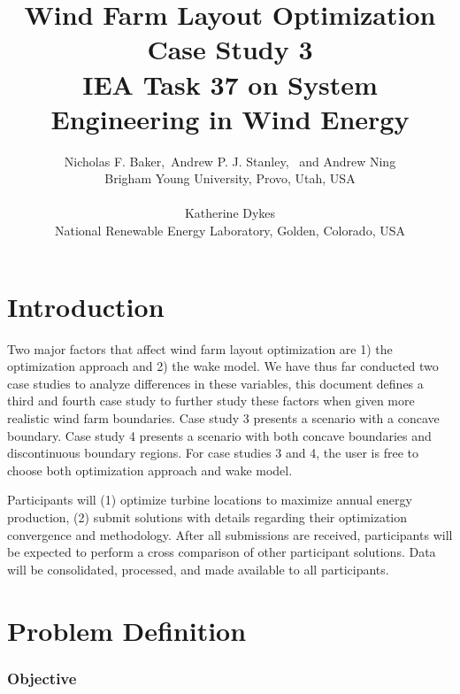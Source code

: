 \documentclass[10pt]{article}
\begin{document}
\title{Wind Farm Layout Optimization Case Study 3
\\
\small{IEA Task 37 on System Engineering in Wind Energy}
}
\author{\large Nicholas F. Baker,\  Andrew P. J. Stanley, \ and Andrew Ning \\
    {\small Brigham Young University, Provo, Utah, USA}\\
\vspace{-1em}\\
\large Katherine Dykes\\
    \small National Renewable Energy Laboratory, Golden, Colorado, USA}
\setlength{\droptitle}{-5em}
\maketitle

\section{Introduction}

    Two major factors that affect wind farm layout optimization are 1) the optimization approach and 2) the wake model.
    We have thus far conducted two case studies to analyze differences in these variables, this document defines a third and fourth case study to further study these factors when given more realistic wind farm boundaries.
    Case study 3 presents a scenario with a concave boundary.
    Case study 4 presents a scenario with both concave boundaries and discontinuous boundary regions.
    For case studies 3 and 4, the user is free to choose both optimization approach and wake model.

    Participants will (1) optimize turbine locations to maximize annual energy production, (2) submit solutions with details regarding their optimization convergence and methodology.
    After all submissions are received, participants will be expected to perform a cross comparison of other participant solutions.
    Data will be consolidated, processed, and made available to all participants.

\section{Problem Definition}

    \subsubsection*{Objective}
\end{document}
